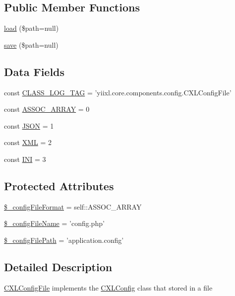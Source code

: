 \subsection*{Public Member Functions}
\begin{DoxyCompactItemize}
\item 
\hyperlink{classCXLConfigFile_accd5e734c3804c022c594c6306b144cb}{load} (\$path=null)
\item 
\hyperlink{classCXLConfigFile_afa15ce48da265db64f8783252c950adb}{save} (\$path=null)
\end{DoxyCompactItemize}
\subsection*{Data Fields}
\begin{DoxyCompactItemize}
\item 
const \hyperlink{classCXLConfigFile_aa607ab5e557e6ebb60b85c5a20ad067f}{CLASS\_\-LOG\_\-TAG} = 'yiixl.core.components.config.CXLConfigFile'
\item 
const \hyperlink{classCXLConfigFile_a97ec175641362d5bd37ac7fc47849bbb}{ASSOC\_\-ARRAY} = 0
\item 
const \hyperlink{classCXLConfigFile_addb3dc7c4a57b9cee800f894e6dc2b4d}{JSON} = 1
\item 
const \hyperlink{classCXLConfigFile_a5f33028773b1db8e11fcd34516dacb28}{XML} = 2
\item 
const \hyperlink{classCXLConfigFile_a5dd04489aced210c3386be64b79e25a4}{INI} = 3
\end{DoxyCompactItemize}
\subsection*{Protected Attributes}
\begin{DoxyCompactItemize}
\item 
\hyperlink{classCXLConfigFile_a1fb40f9b37cbaab55ce287cff87a91d0}{\$\_\-configFileFormat} = self::ASSOC\_\-ARRAY
\item 
\hyperlink{classCXLConfigFile_afa08bc5d4c18ea8c6f0b84257d53e753}{\$\_\-configFileName} = 'config.php'
\item 
\hyperlink{classCXLConfigFile_a9b0ea13dcf8c095cd12429d2b0cc7b96}{\$\_\-configFilePath} = 'application.config'
\end{DoxyCompactItemize}


\subsection{Detailed Description}
\hyperlink{classCXLConfigFile}{CXLConfigFile} implements the \hyperlink{classCXLConfig}{CXLConfig} class that stored in a file 

